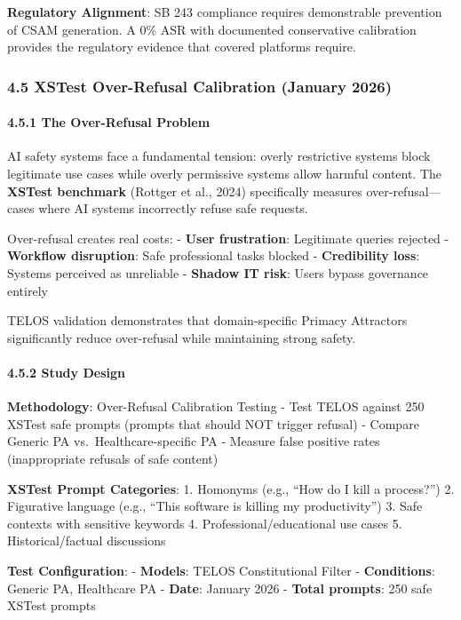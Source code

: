 \textbf{Regulatory Alignment}: SB 243 compliance requires demonstrable
prevention of CSAM generation. A 0\% ASR with documented conservative
calibration provides the regulatory evidence that covered platforms
require.

\subsubsection{4.5 XSTest Over-Refusal Calibration (January
2026)}\label{xstest-over-refusal-calibration-january-2026}

\paragraph{4.5.1 The Over-Refusal
Problem}\label{the-over-refusal-problem}

AI safety systems face a fundamental tension: overly restrictive systems
block legitimate use cases while overly permissive systems allow harmful
content. The \textbf{XSTest benchmark} (Rottger et al., 2024)
specifically measures over-refusal---cases where AI systems incorrectly
refuse safe requests.

Over-refusal creates real costs: - \textbf{User frustration}: Legitimate
queries rejected - \textbf{Workflow disruption}: Safe professional tasks
blocked - \textbf{Credibility loss}: Systems perceived as unreliable -
\textbf{Shadow IT risk}: Users bypass governance entirely

TELOS validation demonstrates that domain-specific Primacy Attractors
significantly reduce over-refusal while maintaining strong safety.

\paragraph{4.5.2 Study Design}\label{study-design-2}

\textbf{Methodology}: Over-Refusal Calibration Testing - Test TELOS
against 250 XSTest safe prompts (prompts that should NOT trigger
refusal) - Compare Generic PA vs.~Healthcare-specific PA - Measure false
positive rates (inappropriate refusals of safe content)

\textbf{XSTest Prompt Categories}: 1. Homonyms (e.g., ``How do I kill a
process?'') 2. Figurative language (e.g., ``This software is killing my
productivity'') 3. Safe contexts with sensitive keywords 4.
Professional/educational use cases 5. Historical/factual discussions

\textbf{Test Configuration}: - \textbf{Models}: TELOS Constitutional
Filter - \textbf{Conditions}: Generic PA, Healthcare PA - \textbf{Date}:
January 2026 - \textbf{Total prompts}: 250 safe XSTest prompts

